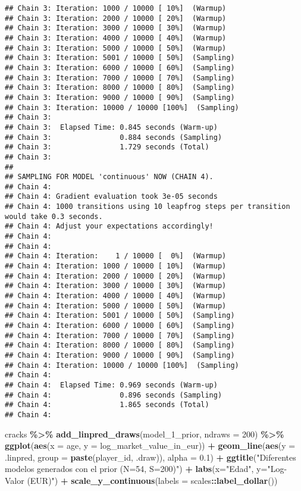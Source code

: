 \documentclass[
]{article}
\newenvironment{Shaded}{\begin{snugshade}}{\end{snugshade}}
\newcommand{\AttributeTok}[1]{\textcolor[rgb]{0.13,0.29,0.53}{#1}}
\newcommand{\DecValTok}[1]{\textcolor[rgb]{0.00,0.00,0.81}{#1}}
\newcommand{\FloatTok}[1]{\textcolor[rgb]{0.00,0.00,0.81}{#1}}
\newcommand{\FunctionTok}[1]{\textcolor[rgb]{0.13,0.29,0.53}{\textbf{#1}}}
\newcommand{\NormalTok}[1]{#1}
\newcommand{\SpecialCharTok}[1]{\textcolor[rgb]{0.81,0.36,0.00}{\textbf{#1}}}
\newcommand{\StringTok}[1]{\textcolor[rgb]{0.31,0.60,0.02}{#1}}
\begin{document}
\begin{verbatim}
## Chain 3: Iteration: 1000 / 10000 [ 10%]  (Warmup)
## Chain 3: Iteration: 2000 / 10000 [ 20%]  (Warmup)
## Chain 3: Iteration: 3000 / 10000 [ 30%]  (Warmup)
## Chain 3: Iteration: 4000 / 10000 [ 40%]  (Warmup)
## Chain 3: Iteration: 5000 / 10000 [ 50%]  (Warmup)
## Chain 3: Iteration: 5001 / 10000 [ 50%]  (Sampling)
## Chain 3: Iteration: 6000 / 10000 [ 60%]  (Sampling)
## Chain 3: Iteration: 7000 / 10000 [ 70%]  (Sampling)
## Chain 3: Iteration: 8000 / 10000 [ 80%]  (Sampling)
## Chain 3: Iteration: 9000 / 10000 [ 90%]  (Sampling)
## Chain 3: Iteration: 10000 / 10000 [100%]  (Sampling)
## Chain 3: 
## Chain 3:  Elapsed Time: 0.845 seconds (Warm-up)
## Chain 3:                0.884 seconds (Sampling)
## Chain 3:                1.729 seconds (Total)
## Chain 3: 
## 
## SAMPLING FOR MODEL 'continuous' NOW (CHAIN 4).
## Chain 4: 
## Chain 4: Gradient evaluation took 3e-05 seconds
## Chain 4: 1000 transitions using 10 leapfrog steps per transition would take 0.3 seconds.
## Chain 4: Adjust your expectations accordingly!
## Chain 4: 
## Chain 4: 
## Chain 4: Iteration:    1 / 10000 [  0%]  (Warmup)
## Chain 4: Iteration: 1000 / 10000 [ 10%]  (Warmup)
## Chain 4: Iteration: 2000 / 10000 [ 20%]  (Warmup)
## Chain 4: Iteration: 3000 / 10000 [ 30%]  (Warmup)
## Chain 4: Iteration: 4000 / 10000 [ 40%]  (Warmup)
## Chain 4: Iteration: 5000 / 10000 [ 50%]  (Warmup)
## Chain 4: Iteration: 5001 / 10000 [ 50%]  (Sampling)
## Chain 4: Iteration: 6000 / 10000 [ 60%]  (Sampling)
## Chain 4: Iteration: 7000 / 10000 [ 70%]  (Sampling)
## Chain 4: Iteration: 8000 / 10000 [ 80%]  (Sampling)
## Chain 4: Iteration: 9000 / 10000 [ 90%]  (Sampling)
## Chain 4: Iteration: 10000 / 10000 [100%]  (Sampling)
## Chain 4: 
## Chain 4:  Elapsed Time: 0.969 seconds (Warm-up)
## Chain 4:                0.896 seconds (Sampling)
## Chain 4:                1.865 seconds (Total)
## Chain 4:
\end{verbatim}

\begin{Shaded}
\begin{Highlighting}[]
\NormalTok{cracks }\SpecialCharTok{\%\textgreater{}\%}
  \FunctionTok{add\_linpred\_draws}\NormalTok{(model\_1\_prior, }\AttributeTok{ndraws =} \DecValTok{200}\NormalTok{) }\SpecialCharTok{\%\textgreater{}\%}
  \FunctionTok{ggplot}\NormalTok{(}\FunctionTok{aes}\NormalTok{(}\AttributeTok{x =}\NormalTok{ age, }\AttributeTok{y =}\NormalTok{ log\_market\_value\_in\_eur)) }\SpecialCharTok{+}
  \FunctionTok{geom\_line}\NormalTok{(}\FunctionTok{aes}\NormalTok{(}\AttributeTok{y =}\NormalTok{ .linpred, }\AttributeTok{group =} \FunctionTok{paste}\NormalTok{(player\_id, .draw)), }\AttributeTok{alpha =} \FloatTok{0.1}\NormalTok{) }\SpecialCharTok{+}
  \FunctionTok{ggtitle}\NormalTok{(}\StringTok{"Diferentes modelos generados con el prior (N=54, S=200)"}\NormalTok{) }\SpecialCharTok{+}
  \FunctionTok{labs}\NormalTok{(}\AttributeTok{x=}\StringTok{"Edad"}\NormalTok{, }\AttributeTok{y=}\StringTok{"Log{-}Valor (EUR)"}\NormalTok{) }\SpecialCharTok{+}
  \FunctionTok{scale\_y\_continuous}\NormalTok{(}\AttributeTok{labels =}\NormalTok{ scales}\SpecialCharTok{::}\FunctionTok{label\_dollar}\NormalTok{())}
\end{Highlighting}
\end{Shaded}
\end{document}
